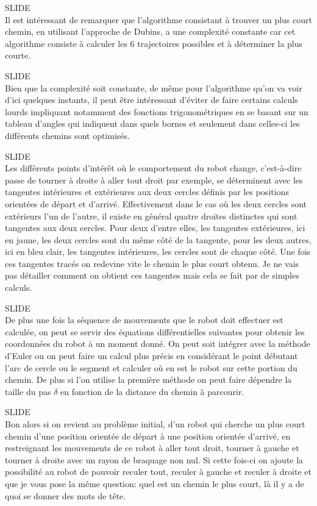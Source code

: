 \documentclass[12pt,a4paper]{article}
\newcommand{\slide}{\vspace{0.6cm}SLIDE\\}
\begin{document}
	\slide
	
	Il est intéressant de remarquer que l'algorithme consistant à trouver un plus court chemin, en utilisant l'approche de Dubins, a une complexité constante car cet algorithme consiste à calculer les 6 trajectoires possibles et à déterminer la plus courte.
	
	\slide
	
	Bien que la complexité soit constante, de même pour l'algorithme qu'on va voir d'ici quelques instants, il peut être intéressant d'éviter de faire certains calculs lourds impliquant notamment des fonctions trigonométriques en se basant sur un tableau d'angles qui indiquent dans quels bornes et seulement dans celles-ci les différents chemins sont optimisés.
	
	\slide
	
	Les différents points d'intérêt où le comportement du robot change, c'est-à-dire passe de tourner à droite à aller tout droit par exemple, se déterminent avec les tangentes intérieures et extérieures aux deux cercles définis par les positions orientées de départ et d'arrivé. Effectivement dans le cas où les deux cercles sont extérieurs l'un de l'autre, il existe en général quatre droites distinctes qui sont tangentes aux deux cercles. Pour deux d'entre elles, les tangentes extérieures, ici en jaune, les deux cercles sont du même côté de la tangente, pour les deux autres, ici en bleu clair, les tangentes intérieures, les cercles sont de chaque côté. Une fois ces tangentes tracés on redevine vite le chemin le plus court obtenu. Je ne vais pas détailler comment on obtient ces tangentes mais cela se fait par de simples calculs.%
	
	\slide
	
	De plus une fois la séquence de mouvements que le robot doit effectuer est calculée, on peut se servir des équations différentielles suivantes pour obtenir les coordonnées du robot à un moment donné. On peut soit intégrer avec la méthode d'Euler ou on peut faire un calcul plus précis en considérant le point débutant l'arc de cercle ou le segment et calculer où en est le robot sur cette portion du chemin. De plus si l'on utilise la première méthode on peut faire dépendre la taille du pas $\delta$ en fonction de la distance du chemin à parcourir.
	
	\slide
	
	Bon alors si on revient au problème initial, d'un robot qui cherche un plus court chemin d'une position orientée de départ à une position orientée d'arrivé, en restreignant les mouvements de ce robot à aller tout droit, tourner à gauche et tourner à droite avec un rayon de braquage non nul. Si cette fois-ci on ajoute la possibilité au robot de pouvoir reculer tout, reculer à gauche et reculer à droite et que je vous pose la même question: quel est un chemin le plus court, là il y a de quoi se donner des mots de tête.
	
\end{document}
